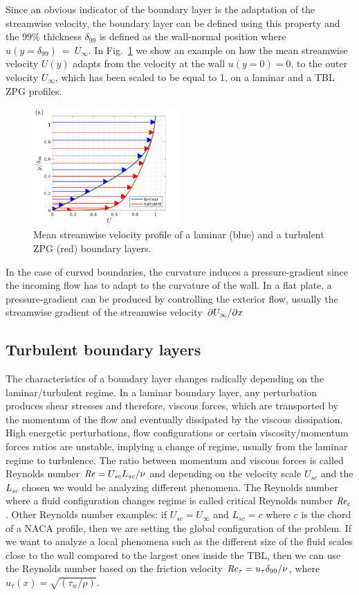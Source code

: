 Since an obvious indicator of the boundary layer is the adaptation of the streamwise velocity, the boundary layer can be defined using this property and the $99\%$ thickness $\delta_{99}$ is defined as the wall-normal position where $u(y=\delta_{99})~=~U_{\infty}$.
In Fig.~\ref{fig:lam_turb_profiles} we show an example on how the mean streamwise velocity $U(y)$ adapts from the velocity at the wall $u(y=0)=0$, to the outer velocity $U_{\infty}$, which has been scaled to be equal to 1, on a laminar and a TBL ZPG profiles.

\begin{figure}[h!]
\centering
\includegraphics[width=0.5\textwidth]{ZPG_lam_turb.jpg}
\caption{ \label{fig:lam_turb_profiles} Mean streamwise velocity profile of a laminar (blue) and a turbulent ZPG (red) boundary layers.
   }
\end{figure}

In the case of curved boundaries, the curvature induces a pressure-gradient since the incoming flow has to adapt to the curvature of the wall. In a flat plate, a pressure-gradient can be produced by controlling the exterior flow, usually the streamwise gradient of the streamwise velocity $\pdv{U_{\infty}}/{x}$


\subsection{Turbulent boundary layers}
The characteristics of a boundary layer changes radically depending on the laminar/turbulent regime.
In a laminar boundary layer, any perturbation produces shear stresses and therefore, viscous forces, which are transported by the momentum of the flow and eventually dissipated by the viscous dissipation. 
High energetic perturbations, flow configurations or certain viscosity/momentum forces ratios are unstable, implying a change of regime, usually from the laminar regime to turbulence. 
The ratio between momentum and viscous forces is called Reynolds number $\mbox{\textit{Re}}=U_{sc} L_{sc} / \nu$ and depending on the velocity scale $U_{sc}$ and the $L_{sc}$ chosen we would be analyzing different phenomena. The Reynolds number where a fluid configuration changes regime is called critical Reynolds number $\mbox{\textit{Re}}_c$.
Other Reynolds number examples: if $U_{sc}=U_{\infty}$ and $L_{sc}=c$ where $c$ is the chord of a NACA profile, then we are setting the global configuration of the problem. If we want to analyze a local phenomena such as the different size of the fluid scales close to the wall compared to the largest ones inside the TBL, then we can use the Reynolds number based on the friction velocity $\mbox{\textit{Re}}_{\tau}=u_{\tau}\delta_{99}/\nu$, where  $u_{\tau}(x)=\sqrt{(\tau_w / \rho)}$.

